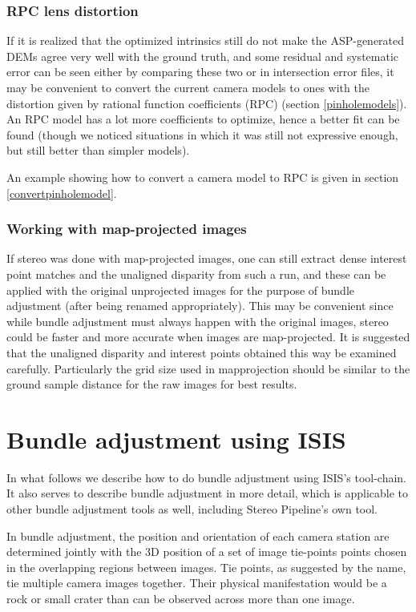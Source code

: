 \subsubsection{RPC lens distortion}
If it is realized that the optimized intrinsics still do not make the ASP-generated
DEMs agree very well with the ground truth, and some residual and systematic error can be seen
either by comparing these two or in intersection error files, it may be convenient
to convert the current camera models to ones with the distortion given by rational function
coefficients (RPC) (section \ref{pinholemodels}). An RPC model has a lot more
coefficients to optimize, hence a better fit can be found (though we noticed situations 
in which it was still not expressive enough, but still better than simpler models). 

An example showing how to convert a camera model to RPC is given in
section \ref{convertpinholemodel}.

\subsubsection{Working with map-projected images}

If stereo was done with map-projected images, one can still extract
dense interest point matches and the unaligned disparity from such a
run, and these can be applied with the original unprojected images for
the purpose of bundle adjustment (after being renamed
appropriately). This may be convenient since while bundle adjustment
must always happen with the original images, stereo could be faster and
more accurate when images are map-projected. It is suggested that the
unaligned disparity and interest points obtained this way be examined
carefully. Particularly the grid size used in mapprojection should be
similar to the ground sample distance for the raw images for best
results.

\section{Bundle adjustment using ISIS}

In what follows we describe how to do bundle adjustment using
\ac{ISIS}'s tool-chain. It also serves to describe bundle adjustment in more
detail, which is applicable to other bundle adjustment tools as well,
including Stereo Pipeline's own tool.

In bundle adjustment, the position and orientation of each camera
station are determined jointly with the 3D position of a set of image
tie-points points chosen in the overlapping regions between
images. Tie points, as suggested by the name, tie multiple camera images
together. Their physical manifestation would be a rock or small crater
than can be observed across more than one image.


